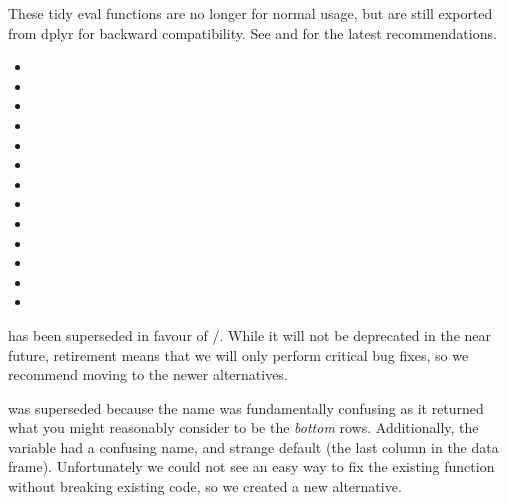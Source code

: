 \documentclass[a4paper]{book}
\begin{document}
\begin{Description}
These tidy eval functions are no longer for normal usage, but are still
exported from dplyr for backward compatibility.
See  and
 for the latest recommendations.
\begin{itemize}

\item{} 
\item{} 
\item{} 
\item{} 
\item{} 
\item{} 
\item{} 
\item{} 
\item{} 
\item{} 
\item{} 
\item{} 
\item{} 

\end{itemize}

\end{Description}
%
\begin{Description}
\strong{[Superseded]}
 has been superseded in favour of /.
While it will not be deprecated in the near future, retirement means
that we will only perform critical bug fixes, so we recommend moving to the
newer alternatives.

 was superseded because the name was fundamentally confusing as
it returned what you might reasonably consider to be the \emph{bottom}
rows. Additionally, the  variable had a confusing name, and strange
default (the last column in the data frame). Unfortunately we could not
see an easy way to fix the existing  function without breaking
existing code, so we created a new alternative.
\end{Description}
\end{document}
